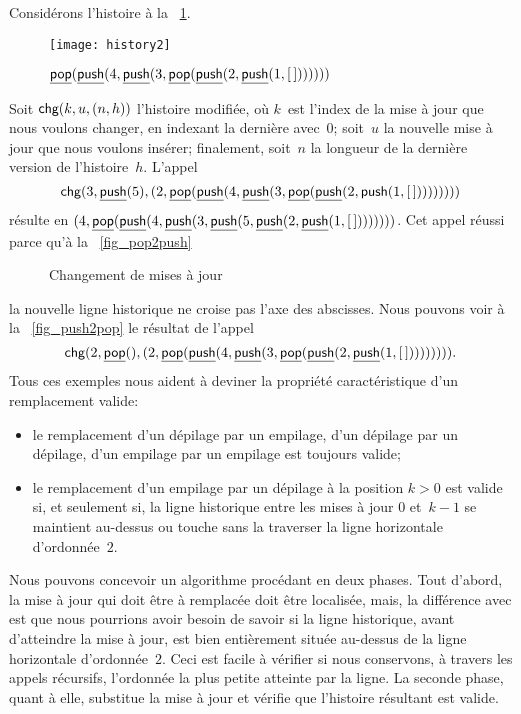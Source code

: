 Considérons l'histoire à la \fig~\ref{fig_history2}.
\begin{figure}[b]
\centering
\texttt{[image: history2]}%
\caption{$\underline{\textsf{pop}}(\underline{\textsf{push}}(4,\underline{\textsf{push}}(3,
          \underline{\textsf{pop}}(\underline{\textsf{push}}(2,\underline{\textsf{push}}(1,[\,]))))))$
\label{fig_history2}}
\end{figure}
Soit \(\textsf{chg}(k,u,({n},{h}))\) l'histoire modifiée, où \(k\)~est l'index de la mise à jour que nous voulons changer, en indexant la dernière avec~\(0\); soit~\(u\) la nouvelle mise à jour que nous voulons insérer; finalement, soit~\(n\) la longueur de la dernière version de l'histoire~\(h\). L'appel
\begin{equation*}
\textsf{chg}(3,\underline{\textsf{push}}(5),
  ({2},{\underline{\textsf{pop}}(\underline{\textsf{push}}(4,\underline{\textsf{push}}(3,
           \underline{\textsf{pop}}(\underline{\textsf{push}}(2,\textsf{push}(1,[\,]))))))}))
\end{equation*}
résulte en
\(({4},{\underline{\textsf{pop}}(\underline{\textsf{push}}(4,\underline{\textsf{push}}(3,\underline{\textsf{push}}(5,
  \underline{\textsf{push}}(2,\underline{\textsf{push}}(1,[\,]))))))})\). Cet appel réussi
parce qu'à la \fig~\ref{fig_pop2push}
\begin{figure}
\centering
{}
\quad
{}
\caption{Changement de mises à jour}
\end{figure}
la nouvelle ligne historique ne croise pas l'axe des abscisses. Nous
pouvons voir à la \fig~\ref{fig_push2pop} le résultat de l'appel
\begin{equation*}
\textsf{chg}(2,\underline{\textsf{pop}}(),
            ({2},{\underline{\textsf{pop}}(\underline{\textsf{push}}(4,\underline{\textsf{push}}(3,
                     \underline{\textsf{pop}}(\underline{\textsf{push}}(2,\underline{\textsf{push}}(1,[\,]))))))})).
\end{equation*}
Tous ces exemples nous aident à deviner la propriété caractéristique
d'un remplacement valide:
\begin{itemize}

  \item le remplacement d'un dépilage par un empilage, d'un dépilage par
  un dépilage, d'un empilage par un empilage est toujours valide;

  \item le remplacement d'un empilage par un dépilage à la position
    \(k>0\) est valide si, et seulement si, la ligne historique entre
    les mises à jour \(0\) et~\(k-1\) se maintient au-dessus ou touche
    sans la traverser la ligne horizontale d'ordonnée~\(2\).

\end{itemize}
Nous pouvons concevoir un algorithme procédant en deux phases. Tout
d'abord, la mise à jour qui doit être à remplacée doit être localisée,
mais, la différence avec  est que nous pourrions
avoir besoin de savoir si la ligne historique, avant d'atteindre la
mise à jour, est bien entièrement située au-dessus de la ligne
horizontale d'ordonnée~\(2\). Ceci est facile à vérifier si nous
conservons, à travers les appels récursifs, l'ordonnée la plus petite
atteinte par la ligne. La seconde phase, quant à elle, substitue la mise à jour et vérifie que l'histoire résultant est valide.

